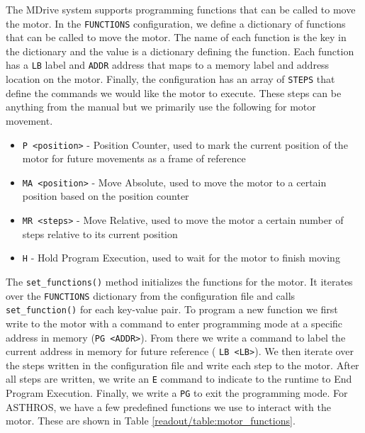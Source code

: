 The MDrive system supports programming functions that can be called to move the motor.
In the \texttt{FUNCTIONS} configuration, we define a dictionary of functions that can be called to move the motor.
The name of each function is the key in the dictionary and the value is a dictionary defining the function.
Each function has a \texttt{LB} label and \texttt{ADDR} address that maps to a memory label and address location on the motor.
Finally, the configuration has an array of \texttt{STEPS} that define the commands we would like the motor to execute.
These steps can be anything from the manual but we primarily use the following for motor movement.
\begin{itemize}
    \item \texttt{P <position>} - Position Counter, used to mark the current position of the motor for future movements as a frame of reference
    \item \texttt{MA <position>} - Move Absolute, used to move the motor to a certain position based on the position counter
    \item \texttt{MR <steps>} - Move Relative, used to move the motor a certain number of steps relative to its current position 
    \item \texttt{H} - Hold Program Execution, used to wait for the motor to finish moving 
\end{itemize}

The \texttt{set\_functions()} method initializes the functions for the motor.
It iterates over the \texttt{FUNCTIONS} dictionary from the configuration file and calls \texttt{set\_function()} for each key-value pair.
To program a new function we first write to the motor with a command to enter programming mode at a specific address in memory (\texttt{PG <ADDR>}). 
From there we write a command to label the current address in memory for future reference ( \texttt{LB <LB>}).
We then iterate over the steps written in the configuration file and write each step to the motor.
After all steps are written, we write an \texttt{E} command to indicate to the runtime to End Program Execution.
Finally, we write a \texttt{PG} to exit the programming mode. 
For ASTHROS, we have a few predefined functions we use to interact with the motor. 
These are shown in Table \ref{readout/table:motor_functions}.

